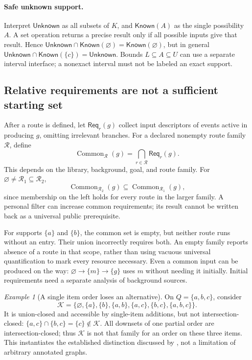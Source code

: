 \documentclass[11pt,a4paper]{article}
\theoremstyle{remark}
\newtheorem{example}[definition]{Example}
\newcommand{\Known}{\mathsf{Known}}
\newcommand{\Unknown}{\mathsf{Unknown}}
\newcommand{\Req}{\mathsf{Req}}
\begin{document}
\paragraph{Safe unknown support.}
Interpret \(\Unknown\) as all subsets of \(K\), and \(\Known(A)\)
as the single possibility \(A\). A set operation returns a precise result only
if all possible inputs give that result. Hence
\(\Unknown\cap\Known(\varnothing)=\Known(\varnothing)\), but in general
\(\Unknown\cap\Known(\{c\})=\Unknown\).
Bounds \(L\subseteq A\subseteq U\) can use a separate interval
interface; a nonexact interval must not be labeled an exact support.

\subsection{Relative requirements are not a sufficient starting set}
After a route is defined, let \(\Req_r(g)\) collect input descriptors of
events active in producing \(g\), omitting irrelevant branches.
For a declared nonempty route family \(\mathcal R\), define
\[
 \operatorname{Common}_{\mathcal R}(g)=
       \bigcap_{r\in\mathcal R}\Req_r(g).
\]
This depends on the library, background, goal, and route family.
For \(\varnothing\neq\mathcal R_1\subseteq\mathcal R_2\),
\[
 \operatorname{Common}_{\mathcal R_2}(g)
 \subseteq\operatorname{Common}_{\mathcal R_1}(g),
\]
since membership on the left holds for every route in the larger family.
A personal filter can increase common requirements; its result cannot be
written back as a universal public prerequisite.

For supports \(\{a\}\) and \(\{b\}\), the common set is empty, but neither
route runs without an entry. Their union incorrectly requires both.
An empty family reports absence of a route in that scope, rather than
using vacuous universal quantification to mark every resource necessary.
Even a common input can be produced on the way:
\(\varnothing\to\{m\}\to\{g\}\) uses \(m\) without needing it initially.
Initial requirements need a separate analysis of background sources.

\begin{example}[A single item order loses an alternative]
On \(Q=\{a,b,c\}\), consider
\[
 \mathcal K=\{\varnothing,\{a\},\{b\},\{a,b\},
                    \{a,c\},\{b,c\},\{a,b,c\}\}.
\]
It is union-closed and accessible by single-item additions, but not
intersection-closed: \(\{a,c\}\cap\{b,c\}=\{c\}\notin\mathcal K\).
All downsets of one partial order are intersection-closed; thus
\(\mathcal K\) is not that family for an order on these three items.
This instantiates the established distinction discussed by \citet{spaces},
not a limitation of arbitrary annotated graphs.
\end{example}
\end{document}
